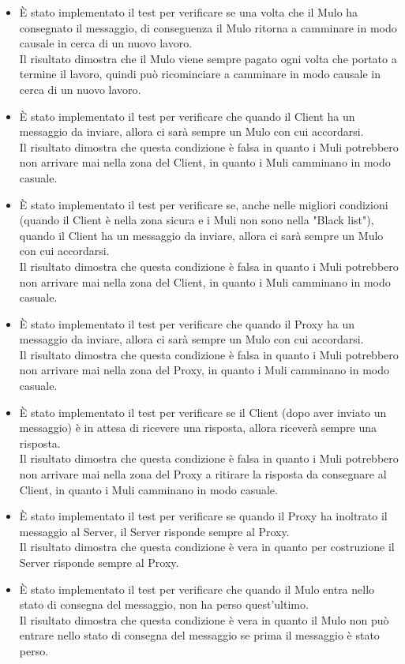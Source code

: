 \documentclass[13pt,a4paper]{article}
\begin{document}
\begin{itemize}
	\item È stato implementato il test per verificare se  una volta che il Mulo ha consegnato il messaggio, di conseguenza il Mulo ritorna a camminare in modo causale in cerca di un nuovo lavoro.\\
	Il risultato dimostra che il Mulo viene sempre pagato ogni volta che portato a termine il lavoro, quindi può ricominciare a camminare in modo causale in cerca di un nuovo lavoro.
	\item È stato implementato il test per verificare che quando il Client ha un messaggio da inviare, allora ci sarà sempre un Mulo con cui accordarsi.\\
	Il risultato dimostra che questa condizione è falsa in quanto i Muli potrebbero non arrivare mai nella zona del Client, in quanto i Muli camminano in modo casuale.
	\item È stato implementato il test per verificare se, anche nelle migliori condizioni (quando il Client è nella zona sicura e i Muli non sono nella "Black list"), quando il Client ha un messaggio da inviare, allora ci sarà sempre un Mulo con cui accordarsi.\\
	Il risultato dimostra che questa condizione è falsa in quanto i Muli potrebbero non arrivare mai nella zona del Client, in quanto i Muli camminano in modo casuale.
	\item È stato implementato il test per verificare che quando il Proxy ha un messaggio da inviare, allora ci sarà sempre un Mulo con cui accordarsi.\\
	Il risultato dimostra che questa condizione è falsa in quanto i Muli potrebbero non arrivare mai nella zona del Proxy, in quanto i Muli camminano in modo casuale.
	\item È stato implementato il test per verificare se il Client (dopo aver inviato un messaggio) è in attesa di ricevere una risposta, allora riceverà sempre una risposta.\\
	Il risultato dimostra che questa condizione è falsa in quanto i Muli potrebbero non arrivare mai nella zona del Proxy a ritirare la risposta da consegnare al Client, in quanto i Muli camminano in modo casuale.
	\item È stato implementato il test per verificare se quando il Proxy ha inoltrato il messaggio al Server, il Server risponde sempre al Proxy.\\
	Il risultato dimostra che questa condizione è vera in quanto per costruzione il Server risponde sempre al Proxy.
	\item È stato implementato il test per verificare che quando il Mulo entra nello stato di consegna del messaggio, non ha perso quest'ultimo.\\
	Il risultato dimostra che questa condizione è vera in quanto il Mulo non può entrare nello stato di consegna del messaggio se prima il messaggio è stato perso. 
\end{itemize}
	
	
\end{document}
